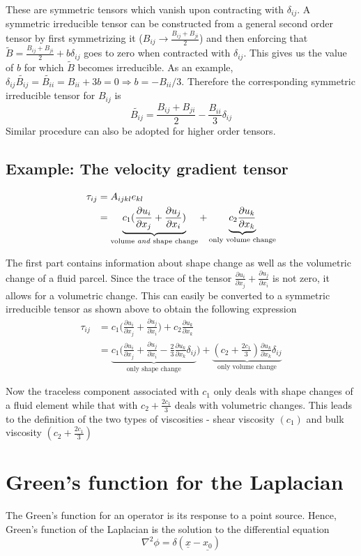 \documentclass[11pt, letterpaper]{article}
\newcommand{\dl}{\delta}
\newcommand{\dij}{\delta_{ij}}
\newcommand{\1}{\bm{1}}
\newcommand{\pd}[2]{\frac{\partial #1}{\partial #2}}
\newcommand{\un}[1]{\underline{#1}}
\begin{document}
These are symmetric tensors which vanish upon contracting with $\dij$. A symmetric irreducible tensor can be constructed from a general second order tensor by first symmetrizing it ($B_{ij}\rightarrow\frac{B_{ij}+B_{ji}}{2}$) and then enforcing that $\widetilde{B} =\frac{B_{ij}+B_{ji}}{2} + b \dij$ goes to zero when contracted with $\dij$. This gives us the value of $b$ for which $\widetilde{B}$ becomes irreducible. As an example, $\dij \widetilde{B_{ij}} = \widetilde{B_{ii}} = B_{ii} + 3b = 0 \Rightarrow b= -B_{ii}/3$. Therefore the corresponding symmetric irreducible tensor for $B_{ij}$ is
$$
\widetilde{B_{ij}} = \frac{B_{ij}+B_{ji}}{2} - \frac{B_{ii}}{3}\dij
$$
Similar procedure can also be adopted for higher order tensors.

\subsection{Example: The velocity gradient tensor}
\begin{align*}
\tau_{ij} &= A_{ijkl}e_{kl}\\
 &= \underbrace{c_1(\pd{u_i}{x_j}+\pd{u_j}{x_i})}_{\text{volume \textit{and} shape change}} + \underbrace{c_2\pd{u_k}{x_k}}_{\text{only volume change}}
\end{align*}

The first part contains information about shape change as well as the volumetric change of a fluid parcel. Since the trace of the tensor $\pd{u_i}{x_j}+\pd{u_j}{x_i}$ is not zero, it allows for a volumetric change. This can easily be converted to a symmetric irreducible tensor as shown above to obtain the following expression
\begin{align*}
\tau_{ij} &= c_1\bigg(\pd{u_i}{x_j}+\pd{u_j}{x_i}\bigg) +c_2\pd{u_k}{x_k} \\
&=\underbrace{c_1\bigg(\pd{u_i}{x_j}+\pd{u_j}{x_i} - \frac{2}{3}\pd{u_k}{x_k}\dl_{ij}}_{\text{only shape change}}\bigg) + \underbrace{(c_2+\frac{2 c_1}{3})\pd{u_k}{x_k}\dij}_{\text{only volume change}}
\end{align*}

Now the traceless component associated with $c_1$ only deals with shape changes of a fluid element while that with $c_2+\frac{2 c_1}{3}$ deals with volumetric changes. This leads to the definition of the two types of viscosities - shear viscosity $(c_1)$ and bulk viscosity $(c_2+\frac{2 c_1}{3})$

\section{Green's function for the Laplacian}
The Green's function for an operator is its response to a point source. Hence, Green's function of the Laplacian is the solution to the differential equation
$$
\nabla ^2\phi = \delta(\un{x}-\un{x_0})
$$
\end{document}
